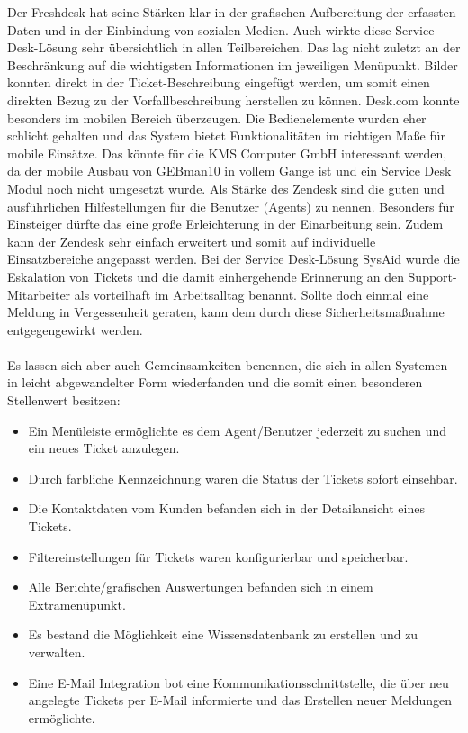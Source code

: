 \noindent
Der Freshdesk hat seine Stärken klar in der grafischen Aufbereitung der erfassten Daten und in der Einbindung von sozialen Medien. Auch wirkte diese Service Desk-Lösung sehr übersichtlich in allen Teilbereichen. Das lag nicht zuletzt an der Beschränkung auf die wichtigsten Informationen im jeweiligen Menüpunkt. Bilder konnten direkt in der Ticket-Beschreibung eingefügt werden, um somit einen direkten Bezug zu der Vorfallbeschreibung herstellen zu können.
\newline
Desk.com konnte besonders im mobilen Bereich überzeugen. Die Bedienelemente wurden eher schlicht gehalten und das System bietet Funktionalitäten im richtigen Maße für mobile Einsätze. Das könnte für die KMS Computer GmbH interessant werden, da der mobile Ausbau von GEBman10 in vollem Gange ist und ein Service Desk Modul noch nicht umgesetzt wurde. \newline
Als Stärke des Zendesk sind die guten und ausführlichen Hilfestellungen für die Benutzer (Agents) zu nennen. Besonders für Einsteiger dürfte das eine große Erleichterung in der Einarbeitung sein. Zudem kann der Zendesk sehr einfach erweitert und somit auf individuelle Einsatzbereiche angepasst werden. \newline
Bei der Service Desk-Lösung SysAid wurde die Eskalation von Tickets und die damit einhergehende Erinnerung an den Support-Mitarbeiter als vorteilhaft im Arbeitsalltag benannt. Sollte doch einmal eine Meldung in Vergessenheit geraten, kann dem durch diese Sicherheitsmaßnahme entgegengewirkt werden.\\\\

\noindent
Es lassen sich aber auch Gemeinsamkeiten benennen, die sich in allen Systemen in leicht abgewandelter Form wiederfanden und die somit einen besonderen Stellenwert besitzen:

\begin{itemize}
\item Ein Menüleiste ermöglichte es dem Agent/Benutzer jederzeit zu suchen und ein neues Ticket anzulegen.
		 
\item Durch farbliche Kennzeichnung waren die Status der Tickets sofort einsehbar.
		
\item Die Kontaktdaten vom Kunden befanden sich in der Detailansicht eines Tickets.

\item Filtereinstellungen für Tickets waren konfigurierbar und speicherbar.

\item Alle Berichte/grafischen Auswertungen befanden sich in einem Extramenüpunkt.

\item Es bestand die Möglichkeit eine Wissensdatenbank zu erstellen und zu verwalten.

\item Eine E-Mail Integration bot eine Kommunikationsschnittstelle, die über neu angelegte Tickets per E-Mail informierte und das Erstellen neuer Meldungen ermöglichte.\\ 
\end{itemize}

